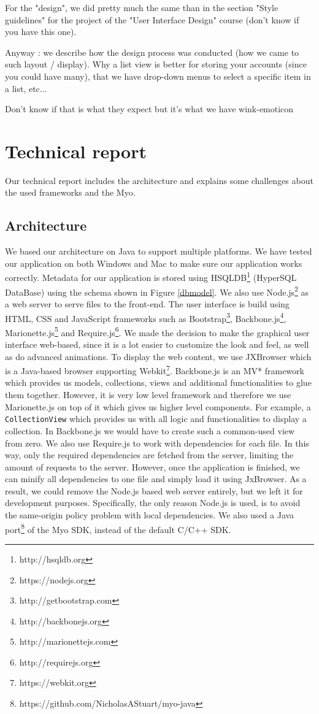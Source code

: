 \documentclass{article}
\begin{document}
For the "design", we did pretty much the same than in the section "Style guidelines" for the project of the "User Interface Design" course (don't know if you have this one). 

Anyway : we describe how the design process was conducted (how we  came to such layout / display). Why a list view is better for storing your accounts (since you could have many), that we have drop-down menus to select a specific item in a list, etc... 

Don't know if that is what they expect but it's what we have wink-emoticon

\section{Technical report}

Our technical report includes the architecture and explains some challenges about the used frameworks and the Myo.
\subsection{Architecture}

We based our architecture on Java to support multiple platforms. We have tested our application on both Windows and Mac to make sure our application works correctly. Metadata for our application is stored using HSQLDB\footnote{http://hsqldb.org} (HyperSQL DataBase) using the schema shown in Figure \ref{dbmodel}. We also use Node.js\footnote{https://nodejs.org} as a web server to serve files to the front-end.  The user interface is build using HTML, CSS and JavaScript frameworks such as Bootstrap\footnote{http://getbootstrap.com}, Backbone.js\footnote{http://backbonejs.org}, Marionette.js\footnote{http://marionettejs.com} and Require.js\footnote{http://requirejs.org}. We made the decision to make the graphical user interface web-based, since it is a lot easier to customize the look and feel, as well as do advanced animations. To display the web content, we use JXBrowser which is a Java-based browser supporting Webkit\footnote{https://webkit.org}. Backbone.js is an MV* framework which provides us models, collections, views and additional functionalities to glue them together. However, it is very low level framework and therefore we use Marionette.js on top of it which gives us higher level components. For example, a \texttt{CollectionView} which provides us with all logic and functionalities to display a collection. In Backbone.js we would have to create such a common-used view from zero. We also use Require.js to work with dependencies for each file. In this way, only the required dependencies are fetched from the server, limiting the amount of requests to the server. However, once the application is finished, we can minify all dependencies to one file and simply load it using JxBrowser. As a result, we could remove the Node.js based web server entirely, but we left it for development purposes. Specifically, the only reason Node.js is used, is to avoid the same-origin policy problem with local dependencies. We also used a Java port\footnote{https://github.com/NicholasAStuart/myo-java} of the Myo SDK, instead of the default C/C++ SDK.
\end{document}
